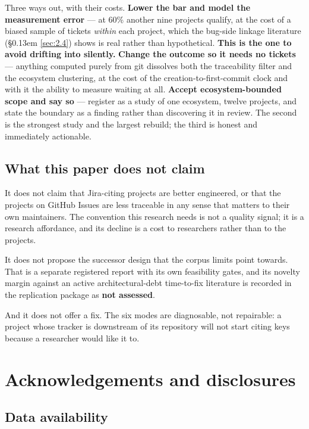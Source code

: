 \documentclass[conference]{IEEEtran}
\begin{document}
Three ways out, with their costs. \textbf{Lower the bar and model the measurement error} --- at 60\% another nine projects qualify, at the cost of a biased sample of tickets \emph{within} each project, which the bug-side linkage literature (\S\kern0.13em \ref{sec:2.4}) shows is real rather than hypothetical. \textbf{This is the one to avoid drifting into silently.} \textbf{Change the outcome so it needs no tickets} --- anything computed purely from git dissolves both the traceability filter and the ecosystem clustering, at the cost of the creation-to-first-commit clock and with it the ability to measure waiting at all. \textbf{Accept ecosystem-bounded scope and say so} --- register as a study of one ecosystem, twelve projects, and state the boundary as a finding rather than discovering it in review. The second is the strongest study and the largest rebuild; the third is honest and immediately actionable.

\subsection{What this paper does not claim}
\label{sec:7.5}

It does not claim that Jira-citing projects are better engineered, or that the projects on GitHub Issues are less traceable in any sense that matters to their own maintainers. The convention this research needs is not a quality signal; it is a research affordance, and its decline is a cost to researchers rather than to the projects.

It does not propose the successor design that the corpus limits point towards. That is a separate registered report with its own feasibility gates, and its novelty margin against an active architectural-debt time-to-fix literature is recorded in the replication package as \textbf{not assessed}.

And it does not offer a fix. The six modes are diagnosable, not repairable: a project whose tracker is downstream of its repository will not start citing keys because a researcher would like it to.


\section{Acknowledgements and disclosures}
\label{sec:8}

\subsection{Data availability}
\label{sec:8.1}
\end{document}
